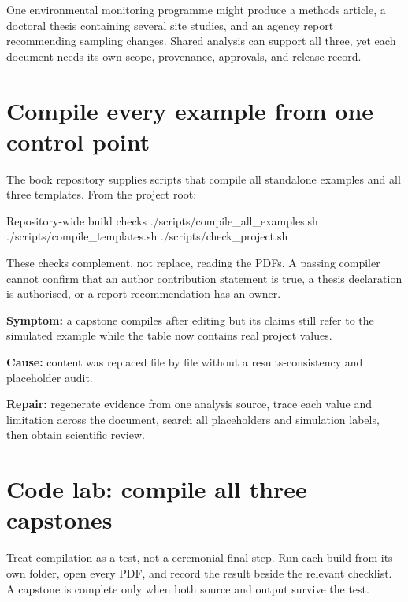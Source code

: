 \begin{scienceinpractice}
One environmental monitoring programme might produce a methods article, a
doctoral thesis containing several site studies, and an agency report recommending
sampling changes. Shared analysis can support all three, yet each document needs
its own scope, provenance, approvals, and release record.
\end{scienceinpractice}

\section{Compile every example from one control point}

The book repository supplies scripts that compile all standalone examples and
all three templates. From the project root:

\begin{terminalcode}{Repository-wide build checks}
./scripts/compile_all_examples.sh
./scripts/compile_templates.sh
./scripts/check_project.sh
\end{terminalcode}

These checks complement, not replace, reading the PDFs. A passing compiler
cannot confirm that an author contribution statement is true, a thesis
declaration is authorised, or a report recommendation has an owner.

\begin{commonerror}
\textbf{Symptom:} a capstone compiles after editing but its claims still refer to
the simulated example while the table now contains real project values.

\textbf{Cause:} content was replaced file by file without a results-consistency
and placeholder audit.

\textbf{Repair:} regenerate evidence from one analysis source, trace each value
and limitation across the document, search all placeholders and simulation
labels, then obtain scientific review.
\end{commonerror}

\section{Code lab: compile all three capstones}

\begin{codelab}
Treat compilation as a test, not a ceremonial final step. Run each build from
its own folder, open every PDF, and record the result beside the relevant
checklist. A capstone is complete only when both source and output survive the
test.
\end{codelab}

